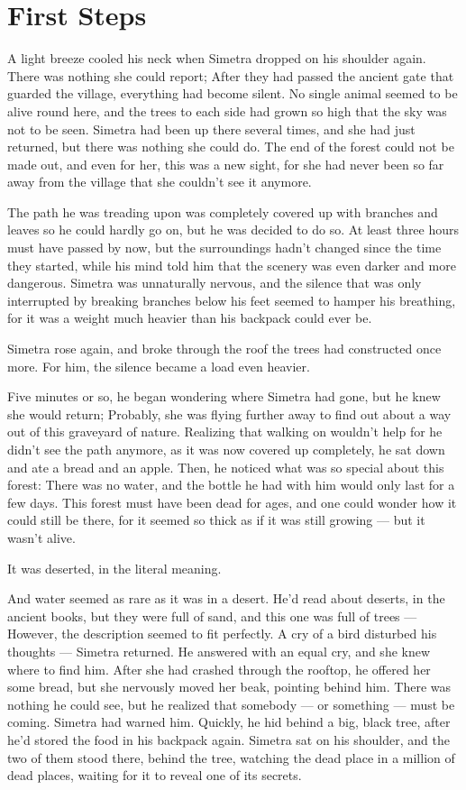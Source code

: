 \chapter{First Steps}
\label{cha:first-steps}
A light breeze cooled his neck when Simetra dropped on his shoulder again. There was nothing she could report; After they had passed the ancient gate that guarded the village, everything had become silent. No single animal seemed to be alive round here, and the trees to each side had grown so high that the sky was not to be seen. 
Simetra had been up there several times, and she had just returned, but there was nothing she could do. The end of the forest could not be made out, and even for her, this was a new sight, for she had never been so far away from the village that she couldn't see it anymore. 

The path he was treading upon was completely covered up with branches and leaves so he could hardly go on, but he was decided to do so. At least three hours must have passed by now, but the surroundings hadn't changed since the time they started, while his mind told him that the scenery was even darker and more dangerous. Simetra was unnaturally nervous, and the silence that was only interrupted by breaking branches below his feet seemed to hamper his breathing, for it was a weight much heavier than his backpack could ever be.

Simetra rose again, and broke through the roof the trees had constructed once more. For him, the silence became a load even heavier.

Five minutes or so, he began wondering where Simetra had gone, but he knew she would return; Probably, she was flying further away to find out about a way out of this graveyard of nature. Realizing that walking on wouldn't help for he didn't see the path anymore, as it was now covered up completely, he sat down and ate a bread and an apple. Then, he noticed what was so special about this forest: There was no water, and the bottle he had with him would only last for a few days. This forest must have been dead for ages, and one could wonder how it could still be there, for it seemed so thick as if it was still growing --- but it wasn't alive. 

It was deserted, in the literal meaning. 

And water seemed as rare as it was in a desert. He'd read about deserts, in the ancient books, but they were full of sand, and this one was full of trees --- However, the description seemed to fit perfectly. 
A cry of a bird disturbed his thoughts --- Simetra returned. He answered with an equal cry, and she knew where to find him. After she had crashed through the rooftop, he offered her some bread, but she nervously moved her beak, pointing behind him. There was nothing he could see, but he realized that somebody --- or something --- must be coming. Simetra had warned him. 
Quickly, he hid behind a big, black tree, after he'd stored the food in his backpack again. Simetra sat on his shoulder, and the two of them stood there, behind the tree, watching the dead place in a million of dead places, waiting for it to reveal one of its secrets.

